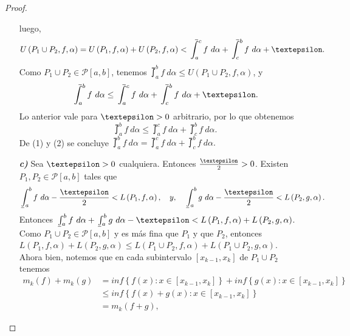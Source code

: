 \begin{proof}
\begin{itemize}
\begin{equation*}
  \end{equation*}
  luego,
  \begin{equation*}
    U\left(P_1\cup P_2,f,\alpha\right) = U\left(P_1,f,\alpha\right)+U\left(P_2,f,\alpha\right) < \upint_a^c f\ d\alpha + \upint_c^b f\ d\alpha + \text{\textepsilon}.
  \end{equation*}
  Como $P_1\cup P_2\in\mathcal{P}\left[a,b\right]$, tenemos $\upint_a^b f\ d\alpha \leq U\left(P_1\cup P_2,f,\alpha\right)$, y
  \begin{equation*}
    \upint_a^b f\ d\alpha \leq \upint_a^c f\ d\alpha + \upint_c^b f\ d\alpha +\text{\textepsilon}.
  \end{equation*}
  Lo anterior vale para $\text{\textepsilon}>0$ arbitrario, por lo que obtenemos
  \setcounter{equation}{1}
  \begin{equation}
    \upint_a^b f\ d\alpha \leq \upint_a^c f\ d\alpha + \upint_c^b f\ d\alpha.
  \end{equation}
  De (1) y (2) se concluye $\upint_a^b f\ d\alpha = \upint_a^c f\ d\alpha + \upint_c^b f\ d\alpha.$
  \item[\textbf{\textit{c)}}]Sea $\text{\textepsilon}>0$ cualquiera. Entonces $\frac{\text{\textepsilon}}{2}>0$. Existen $P_1,P_2\in\mathcal{P}\left[a,b\right]$ tales que
  \begin{equation*}
    \lowint_a^b f\ d\alpha - \frac{\text{\textepsilon}}{2} < L\left(P_1,f,\alpha\right),\quad y,\quad \lowint_a^b g\ d\alpha - \frac{\text{\textepsilon}}{2} < L\left(P_2,g,\alpha\right).
  \end{equation*}
  Entonces $\lowint_a^b f\ d\alpha + \lowint_a^b g\ d\alpha - \text{\textepsilon} < L\left(P_1,f,\alpha\right)+L\left(P_2,g,\alpha\right)$. Como $P_1\cup P_2 \in \mathcal{P}\left[a,b\right]$ y es más fina que $P_1$ y que $P_2$, entonces $L\left(P_1,f,\alpha\right)+L\left(P_2,g,\alpha\right) \leq L\left(P_1\cup P_2,f,\alpha\right)+L\left(P_1\cup P_2,g,\alpha\right)$.\\
  Ahora bien, notemos que en cada subintervalo $\left[x_{k-1},x_k\right]$ de $P_1\cup P_2$ tenemos
  \begin{align*}
    m_k\left(f\right)+m_k\left(g\right)&=inf\left\lbrace f\left(x\right): x\in\left[x_{k-1},x_k\right]\right\rbrace+inf\left\lbrace g\left(x\right): x\in\left[x_{k-1},x_k\right]\right\rbrace\\
    &\leq inf\left\lbrace f\left(x\right)+g\left(x\right): x\in\left[x_{k-1},x_k\right]\right\rbrace\\
    &=m_k\left(f+g\right),
  \end{align*}

\end{itemize}
\end{proof}
